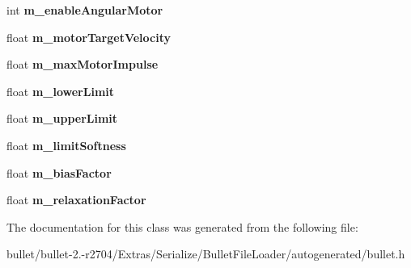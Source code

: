 \begin{DoxyCompactItemize}
\item 
\hypertarget{class_bullet_1_1bt_hinge_constraint_double_data_a75b8fbe6179c8258b748f7631038c6be}{int {\bfseries m\+\_\+enable\+Angular\+Motor}}\label{class_bullet_1_1bt_hinge_constraint_double_data_a75b8fbe6179c8258b748f7631038c6be}

\item 
\hypertarget{class_bullet_1_1bt_hinge_constraint_double_data_a724ec989ad4be23585504c012dc2ccf6}{float {\bfseries m\+\_\+motor\+Target\+Velocity}}\label{class_bullet_1_1bt_hinge_constraint_double_data_a724ec989ad4be23585504c012dc2ccf6}

\item 
\hypertarget{class_bullet_1_1bt_hinge_constraint_double_data_abf22a17a10dc39d11bc7ac1934d43dd7}{float {\bfseries m\+\_\+max\+Motor\+Impulse}}\label{class_bullet_1_1bt_hinge_constraint_double_data_abf22a17a10dc39d11bc7ac1934d43dd7}

\item 
\hypertarget{class_bullet_1_1bt_hinge_constraint_double_data_a5bd514edeba5a640de0bb87759393180}{float {\bfseries m\+\_\+lower\+Limit}}\label{class_bullet_1_1bt_hinge_constraint_double_data_a5bd514edeba5a640de0bb87759393180}

\item 
\hypertarget{class_bullet_1_1bt_hinge_constraint_double_data_a848b07d0b441711dab4a8c13b66e31dc}{float {\bfseries m\+\_\+upper\+Limit}}\label{class_bullet_1_1bt_hinge_constraint_double_data_a848b07d0b441711dab4a8c13b66e31dc}

\item 
\hypertarget{class_bullet_1_1bt_hinge_constraint_double_data_a7efa5f81320c9842cb7312d1ebce0bbd}{float {\bfseries m\+\_\+limit\+Softness}}\label{class_bullet_1_1bt_hinge_constraint_double_data_a7efa5f81320c9842cb7312d1ebce0bbd}

\item 
\hypertarget{class_bullet_1_1bt_hinge_constraint_double_data_a2b18c0f936846fdf7b8be5b1c0c87717}{float {\bfseries m\+\_\+bias\+Factor}}\label{class_bullet_1_1bt_hinge_constraint_double_data_a2b18c0f936846fdf7b8be5b1c0c87717}

\item 
\hypertarget{class_bullet_1_1bt_hinge_constraint_double_data_af408972897678ffb763758c0bb8aa546}{float {\bfseries m\+\_\+relaxation\+Factor}}\label{class_bullet_1_1bt_hinge_constraint_double_data_af408972897678ffb763758c0bb8aa546}

\end{DoxyCompactItemize}


The documentation for this class was generated from the following file\+:\begin{DoxyCompactItemize}
\item 
bullet/bullet-\/2.-\/r2704/\+Extras/\+Serialize/\+Bullet\+File\+Loader/autogenerated/bullet.\+h\end{DoxyCompactItemize}
